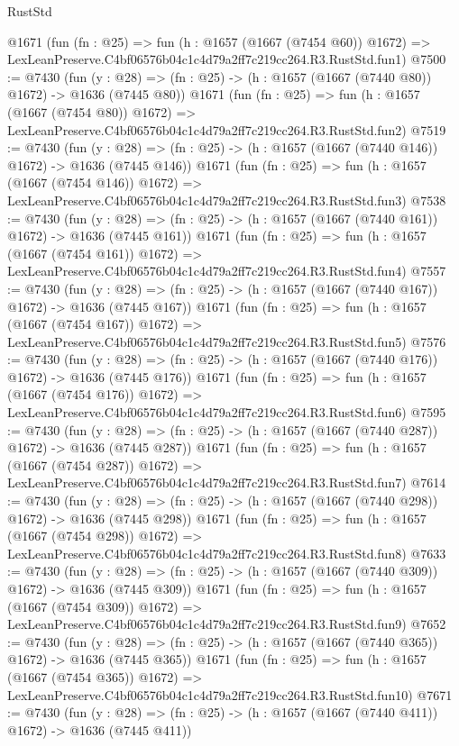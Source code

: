 \begin{lexlean}{RustStd}
\begin{coremodule}
    @1671
    (fun (fn : @25) =>
    fun (h : @1657 (@1667 (@7454 @60)) @1672) =>
    LexLeanPreserve.C4bf06576b04c1c4d79a2ff7c219cc264.R3.RustStd.fun1)
@7500 := @7430
    (fun (y : @28) => (fn : @25) -> (h : @1657 (@1667 (@7440 @80)) @1672) -> @1636 (@7445 @80))
    @1671
    (fun (fn : @25) =>
    fun (h : @1657 (@1667 (@7454 @80)) @1672) =>
    LexLeanPreserve.C4bf06576b04c1c4d79a2ff7c219cc264.R3.RustStd.fun2)
@7519 := @7430
    (fun (y : @28) => (fn : @25) -> (h : @1657 (@1667 (@7440 @146)) @1672) -> @1636 (@7445 @146))
    @1671
    (fun (fn : @25) =>
    fun (h : @1657 (@1667 (@7454 @146)) @1672) =>
    LexLeanPreserve.C4bf06576b04c1c4d79a2ff7c219cc264.R3.RustStd.fun3)
@7538 := @7430
    (fun (y : @28) => (fn : @25) -> (h : @1657 (@1667 (@7440 @161)) @1672) -> @1636 (@7445 @161))
    @1671
    (fun (fn : @25) =>
    fun (h : @1657 (@1667 (@7454 @161)) @1672) =>
    LexLeanPreserve.C4bf06576b04c1c4d79a2ff7c219cc264.R3.RustStd.fun4)
@7557 := @7430
    (fun (y : @28) => (fn : @25) -> (h : @1657 (@1667 (@7440 @167)) @1672) -> @1636 (@7445 @167))
    @1671
    (fun (fn : @25) =>
    fun (h : @1657 (@1667 (@7454 @167)) @1672) =>
    LexLeanPreserve.C4bf06576b04c1c4d79a2ff7c219cc264.R3.RustStd.fun5)
@7576 := @7430
    (fun (y : @28) => (fn : @25) -> (h : @1657 (@1667 (@7440 @176)) @1672) -> @1636 (@7445 @176))
    @1671
    (fun (fn : @25) =>
    fun (h : @1657 (@1667 (@7454 @176)) @1672) =>
    LexLeanPreserve.C4bf06576b04c1c4d79a2ff7c219cc264.R3.RustStd.fun6)
@7595 := @7430
    (fun (y : @28) => (fn : @25) -> (h : @1657 (@1667 (@7440 @287)) @1672) -> @1636 (@7445 @287))
    @1671
    (fun (fn : @25) =>
    fun (h : @1657 (@1667 (@7454 @287)) @1672) =>
    LexLeanPreserve.C4bf06576b04c1c4d79a2ff7c219cc264.R3.RustStd.fun7)
@7614 := @7430
    (fun (y : @28) => (fn : @25) -> (h : @1657 (@1667 (@7440 @298)) @1672) -> @1636 (@7445 @298))
    @1671
    (fun (fn : @25) =>
    fun (h : @1657 (@1667 (@7454 @298)) @1672) =>
    LexLeanPreserve.C4bf06576b04c1c4d79a2ff7c219cc264.R3.RustStd.fun8)
@7633 := @7430
    (fun (y : @28) => (fn : @25) -> (h : @1657 (@1667 (@7440 @309)) @1672) -> @1636 (@7445 @309))
    @1671
    (fun (fn : @25) =>
    fun (h : @1657 (@1667 (@7454 @309)) @1672) =>
    LexLeanPreserve.C4bf06576b04c1c4d79a2ff7c219cc264.R3.RustStd.fun9)
@7652 := @7430
    (fun (y : @28) => (fn : @25) -> (h : @1657 (@1667 (@7440 @365)) @1672) -> @1636 (@7445 @365))
    @1671
    (fun (fn : @25) =>
    fun (h : @1657 (@1667 (@7454 @365)) @1672) =>
    LexLeanPreserve.C4bf06576b04c1c4d79a2ff7c219cc264.R3.RustStd.fun10)
@7671 := @7430
    (fun (y : @28) => (fn : @25) -> (h : @1657 (@1667 (@7440 @411)) @1672) -> @1636 (@7445 @411))

\end{coremodule}
\end{lexlean}
